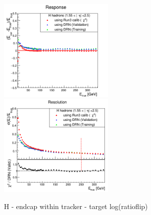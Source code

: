 \begin{figure}                                                                                                                                                               
\includegraphics[width=0.495\textwidth]{./plots_pdf/HCAL_plots/Trained_target_ratioflip_0_500_10/pdf/H_ec_in/EC_within_tracker_corrEtaEndcapHcal.png}
\includegraphics[width=0.495\textwidth]{./plots_pdf/HCAL_plots/Trained_target_ratioflip_0_500_10/pdf/H_ec_in/EC_within_tracker_corrEtaEndcapHcal_reso.png}
\caption{H - endcap within tracker - target log(ratioflip)}
\end{figure}


